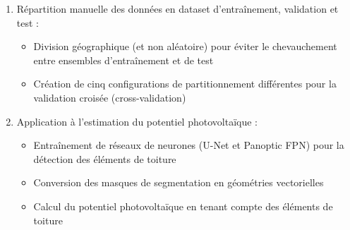 {{{{\begin{enumerate}
    \begin{itemize}
        \item Utilisation de l'outil CVAT (Computer Vision Annotation Tool) permettant un zoom plus important
        \item Révision par deux annotateurs n'ayant pas participé à l'annotation initiale pour limiter les biais
        \item Attention particulière aux classes ayant montré un faible accord inter-annotateurs
    \end{itemize}
    \item Répartition manuelle des données en dataset d'entraînement, validation et test :
    \begin{itemize}
        \item Division géographique (et non aléatoire) pour éviter le chevauchement entre ensembles d'entraînement et de test
        \item Création de cinq configurations de partitionnement différentes pour la validation croisée (cross-validation)
    \end{itemize}

    \item Application à l'estimation du potentiel photovoltaïque :
    \begin{itemize}
        \item Entraînement de réseaux de neurones (U-Net et Panoptic FPN) pour la détection des éléments de toiture
        \item Conversion des masques de segmentation en géométries vectorielles
        \item Calcul du potentiel photovoltaïque en tenant compte des éléments de toiture
    \end{itemize}
\end{enumerate}

}}}}
